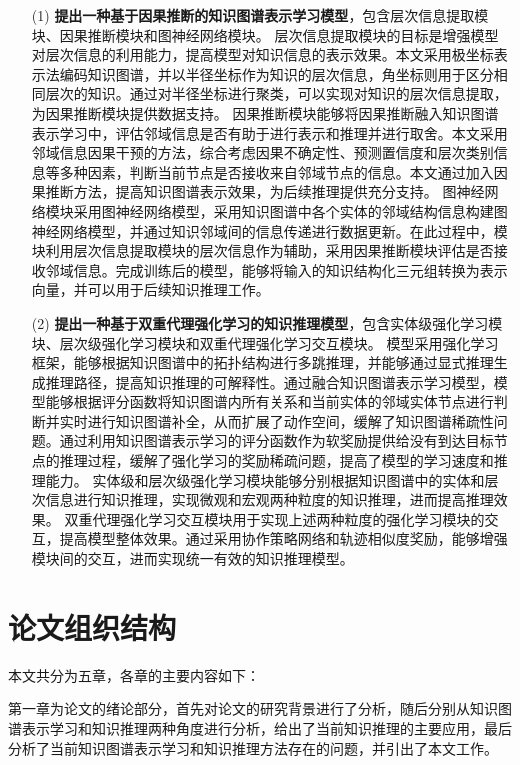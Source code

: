 \documentclass[algorithmlist, AutoFakeBold, AutoFakeSlant, figurelist, tablelist, nomlist, masters]{seuthesix}
\begin{document}
\begin{itemize}
  \item [(1)]
  \textbf{提出一种基于因果推断的知识图谱表示学习模型}，包含层次信息提取模块、因果推断模块和图神经网络模块。
  层次信息提取模块的目标是增强模型对层次信息的利用能力，提高模型对知识信息的表示效果。本文采用极坐标表示法编码知识图谱，并以半径坐标作为知识的层次信息，角坐标则用于区分相同层次的知识。通过对半径坐标进行聚类，可以实现对知识的层次信息提取，为因果推断模块提供数据支持。
  因果推断模块能够将因果推断融入知识图谱表示学习中，评估邻域信息是否有助于进行表示和推理并进行取舍。本文采用邻域信息因果干预的方法，综合考虑因果不确定性、预测置信度和层次类别信息等多种因素，判断当前节点是否接收来自邻域节点的信息。本文通过加入因果推断方法，提高知识图谱表示效果，为后续推理提供充分支持。
  图神经网络模块采用图神经网络模型，采用知识图谱中各个实体的邻域结构信息构建图神经网络模型，并通过知识邻域间的信息传递进行数据更新。在此过程中，模块利用层次信息提取模块的层次信息作为辅助，采用因果推断模块评估是否接收邻域信息。完成训练后的模型，能够将输入的知识结构化三元组转换为表示向量，并可以用于后续知识推理工作。
  \item [(2)]
  \textbf{提出一种基于双重代理强化学习的知识推理模型}，包含实体级强化学习模块、层次级强化学习模块和双重代理强化学习交互模块。
  模型采用强化学习框架，能够根据知识图谱中的拓扑结构进行多跳推理，并能够通过显式推理生成推理路径，提高知识推理的可解释性。通过融合知识图谱表示学习模型，模型能够根据评分函数将知识图谱内所有关系和当前实体的邻域实体节点进行判断并实时进行知识图谱补全，从而扩展了动作空间，缓解了知识图谱稀疏性问题。通过利用知识图谱表示学习的评分函数作为软奖励提供给没有到达目标节点的推理过程，缓解了强化学习的奖励稀疏问题，提高了模型的学习速度和推理能力。
  实体级和层次级强化学习模块能够分别根据知识图谱中的实体和层次信息进行知识推理，实现微观和宏观两种粒度的知识推理，进而提高推理效果。
  双重代理强化学习交互模块用于实现上述两种粒度的强化学习模块的交互，提高模型整体效果。通过采用协作策略网络和轨迹相似度奖励，能够增强模块间的交互，进而实现统一有效的知识推理模型。
\end{itemize}


\section{论文组织结构}
本文共分为五章，各章的主要内容如下：

第一章为论文的绪论部分，首先对论文的研究背景进行了分析，随后分别从知识图谱表示学习和知识推理两种角度进行分析，给出了当前知识推理的主要应用，最后分析了当前知识图谱表示学习和知识推理方法存在的问题，并引出了本文工作。
\end{document}
